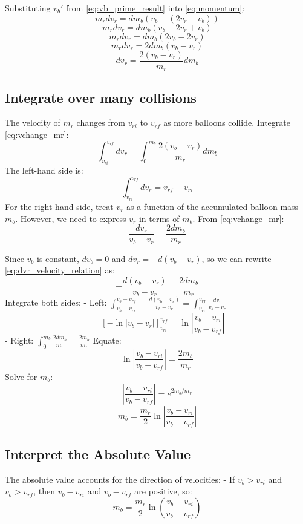 \documentclass{article}
\begin{document}
Substituting \(v_b'\) from  \autoref{eq:vb_prime_result} into \autoref{eq:momentum}:
\[
m_r dv_r = dm_b (v_b - (2 v_r - v_b))
\]
\[
m_r dv_r = dm_b (v_b - 2 v_r + v_b)
\]
\[
m_r dv_r = dm_b (2 v_b - 2 v_r)
\]
\[
m_r dv_r = 2 dm_b (v_b - v_r)
\]
\begin{equation}
dv_r = \frac{2 (v_b - v_r)}{m_r} dm_b \label{eq:vchange_mr}
\end{equation}

\subsection{Integrate over many collisions}
The velocity of \( m_r \) changes from \( v_{ri} \) to \( v_{rf} \) as more balloons collide. Integrate \autoref{eq:vchange_mr}:
\[
\int_{v_{ri}}^{v_{rf}} dv_r = \int_0^{m_b} \frac{2 (v_b - v_r)}{m_r} dm_b
\]
The left-hand side is:
\[
\int_{v_{ri}}^{v_{rf}} dv_r = v_{rf} - v_{ri}
\]
For the right-hand side, treat \( v_r \) as a function of the accumulated balloon mass \( m_b \). However, we need to express \( v_r \) in terms of \( m_b \). From \autoref{eq:vchange_mr}:
\begin{equation}
\frac{dv_r}{v_b - v_r} = \frac{2 dm_b}{m_r}\label{eq:dvr_velocity_relation}
\end{equation}

Since \(v_b\) is constant,  \(dv_b = 0\) and  \(dv_r = -d(v_b-v_r)\), so we can rewrite \autoref{eq:dvr_velocity_relation} as:
\[
-\frac{d(v_b - v_r)}{v_b - v_r} = \frac{2 dm_b}{m_r}
\]
Integrate both sides:
- Left: \( \int_{v_b - v_{ri}}^{v_b - v_{rf}} -\frac{d(v_b - v_r)}{v_b - v_r} = \int_{v_{ri}}^{v_{rf}} \frac{dv_r}{v_b - v_r} \)
\[
= \left[ -\ln|v_b - v_r| \right]_{v_{ri}}^{v_{rf}} = \ln \left| \frac{v_b - v_{ri}}{v_b - v_{rf}} \right|
\]
- Right: \( \int_0^{m_b} \frac{2 dm_b}{m_r} = \frac{2 m_b}{m_r} \)
Equate:
\[
\ln \left| \frac{v_b - v_{ri}}{v_b - v_{rf}} \right| = \frac{2 m_b}{m_r}
\]
Solve for \( m_b \):
\[
\left| \frac{v_b - v_{ri}}{v_b - v_{rf}} \right| = e^{2 m_b / m_r}
\]
\begin{equation}
m_b = \frac{m_r}{2} \ln \left| \frac{v_b - v_{ri}}{v_b - v_{rf}} \right| 
\end{equation}
\subsection{Interpret the Absolute Value}   
The absolute value accounts for the direction of velocities:
- If \( v_b > v_{ri} \) and \( v_b > v_{rf} \),  then \( v_b - v_{ri} \) and \( v_b - v_{rf} \) are positive, so:
\[
m_b = \frac{m_r}{2} \ln \left( \frac{v_b - v_{ri}}{v_b - v_{rf}} \right)
\]
\end{document}
